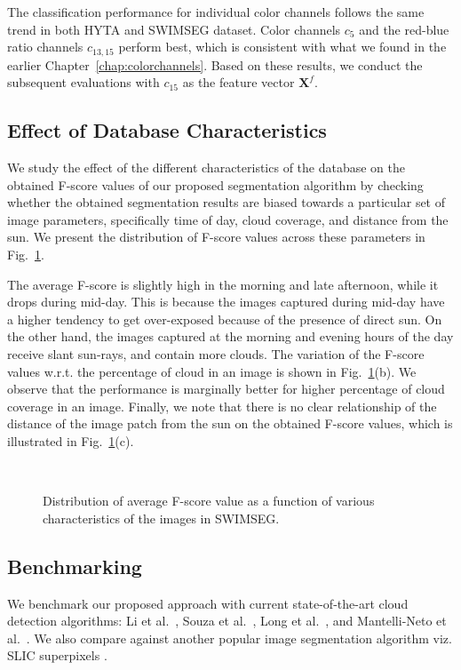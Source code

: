 The classification performance for individual color channels follows the same trend in both HYTA and SWIMSEG dataset. Color channels $c_5$ and the red-blue ratio channels $c_{13,15}$ perform best, which is consistent with what we found in the earlier Chapter~\ref{chap:colorchannels}. Based on these results, we conduct the subsequent evaluations with $c_{15}$ as the feature vector $\mathbf{X}^{f}$.


\subsection{Effect of Database Characteristics}
We study the effect of the different characteristics of the database on the obtained F-score values of our proposed segmentation algorithm by checking whether the obtained segmentation results are biased towards a particular set of image parameters, specifically time of day, cloud coverage, and distance from the sun. We present the distribution of F-score values across these parameters in Fig.~\ref{fig:fscore-distribution}. 

The average F-score is slightly high in the morning and late afternoon, while it drops during mid-day. This is because the images captured during mid-day have a higher tendency to get over-exposed because of the presence of direct sun. On the other hand, the images captured at the morning and evening hours of the day receive slant sun-rays, and contain more clouds. The variation of the F-score values w.r.t. the percentage of cloud in an image is shown in Fig.~\ref{fig:fscore-distribution}(b). We observe that the performance is marginally better for higher percentage of cloud coverage in an image. Finally, we note that there is no clear relationship of the distance of the image patch from the sun on the obtained F-score values, which is illustrated in Fig.~\ref{fig:fscore-distribution}(c).

\begin{figure}[H]
\centering
{}
\\
\caption{Distribution of average F-score value as a function of various characteristics of the images in SWIMSEG.}\label{fig:fscore-distribution}
\end{figure}

\subsection{Benchmarking}
We benchmark our proposed approach with current state-of-the-art cloud detection algorithms: Li et al.\ \cite{Li2011}, Souza et al.\ \cite{Souza}, Long et al.\ \cite{Long}, and Mantelli-Neto et al.\ \cite{Sylvio}. We also compare against another popular image segmentation algorithm viz. SLIC superpixels \cite{SLIC}. 

